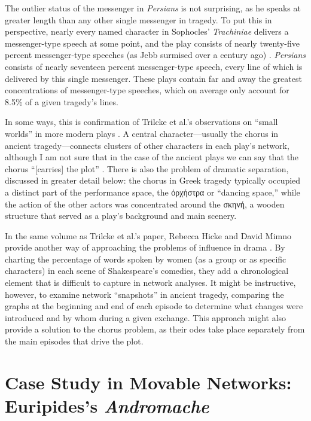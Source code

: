 \documentclass{jcls}
\begin{document}
The outlier status of the messenger in \textit{Persians} is not
surprising, as he speaks at greater length than any other single
messenger in tragedy. To put this in perspective, nearly every named
character in Sophocles' \textit{Trachiniae} delivers a messenger-type
speech at some point, and the play consists of nearly twenty-five
percent messenger-type speeches (as Jebb surmised over a century ago)
\cite{Jebb1902}. \textit{Persians} consists of nearly seventeen
percent messenger-type speech, every line of which is delivered by
this single messenger. These plays contain far and away the greatest
concentrations of messenger-type speeches, which on average only
account for 8.5\% of a given tragedy's lines.

In some ways, this is confirmation of Trilcke et al.'s observations
on ``small worlds'' in more modern plays
\cite[7--33]{Andresen.Reiter2024}. A central character---usually the
chorus in ancient tragedy---connects clusters of other characters in
each play's network, although I am not sure that in the case of the
ancient plays we can say that the chorus ``[carries] the plot''
\cite[22]{Andresen.Reiter2024}. There is also the problem of dramatic
separation, discussed in greater detail below: the chorus in Greek
tragedy typically occupied a distinct part of the performance space,
the ὀρχήστρα or ``dancing space,'' while the action of the other
actors was concentrated around the σκηνή, a wooden structure that
served as a play's background and main scenery.

In the same volume as Trilcke et al.'s paper, Rebecca Hicke and David
Mimno provide another way of approaching the problems of influence in
drama \cite[87--105]{Andresen.Reiter2024}. By charting the percentage
of words spoken by women (as a group or as specific characters) in
each scene of Shakespeare's comedies, they add a chronological
element that is difficult to capture in network analyses. It might be
instructive, however, to examine network ``snapshots'' in ancient
tragedy, comparing the graphs at the beginning and end of each
episode to determine what changes were introduced and by whom during
a given exchange. This approach might also provide a solution to the
chorus problem, as their odes take place separately from the main
episodes that drive the plot.

\section{Case Study in Movable Networks: Euripides's \textit{Andromache}}
\end{document}
